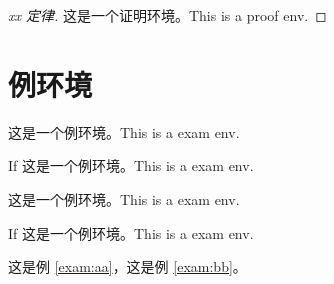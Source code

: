 \documentclass[UTF8,space=auto]{ctexart} %
\begin{document}
\begin{proof}[xx 定律]
	这是一个证明环境。This is a proof env.
\end{proof}

\lipsum[1][1-3]


\section{例环境}
\lipsum[1][1-3]

\begin{exam}\label{exam:aa}%
	这是一个例环境。This is a exam env.
\end{exam}

\begin{exam}
	If 这是一个例环境。This is a exam env.
\end{exam}

\begin{exam}[勾股定理的应用]
	这是一个例环境。This is a exam env.
\end{exam}

\begin{exam}[勾股定理的应用]\label{exam:bb}%
	If 这是一个例环境。This is a exam env.
\end{exam}

\lipsum[1][1-3]

这是例 \ref{exam:aa}，这是例 \ref{exam:bb}。
\end{document}
